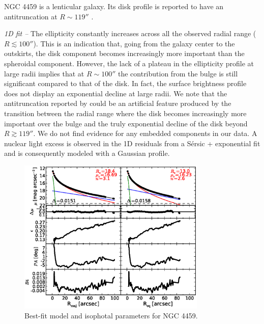 \documentclass[preprint2]{emulateapj}
\newcommand{\fitfigurewidth}{0.8\textwidth}
\begin{document}
  NGC 4459 is a lenticular galaxy.
  Its disk profile is reported to have an antitruncation at $R \sim 119''$ \citep{gutierrez2011}.


  \emph{1D fit -- }
  The ellipticity constantly increases across all the observed radial range ($R \lesssim 100''$).
  This is an indication that, going from the galaxy center to the outskirts,
  the disk component becomes increasingly more important than the spheroidal component.
  However, the lack of a plateau in the ellipticity profile at large radii implies that at $R \sim 100''$ 
  the contribution from the bulge is still significant compared to that of the disk.
  In fact, the surface brightness profile does not display an exponential decline at large radii.
  We note that the antitruncation reported by \cite{gutierrez2011} could be an artificial feature 
  produced by the transition between the radial range where the disk becomes increasingly more important 
  over the bulge and the truly exponential decline of the disk beyond $R \gtrsim 119''$.
  We do not find evidence for any embedded components in our data.
  A nuclear light excess is observed in the 1D residuals from a S\'ersic + exponential fit 
  and is consequently modeled with a Gaussian profile.

  \begin{figure}[h]
  \begin{center}
  \includegraphics[width=\fitfigurewidth]{images/n4459_1Dfit.eps}
  \caption{Best-fit model and isophotal parameters for NGC 4459.}
  \end{center}
  \end{figure}
\end{document}
